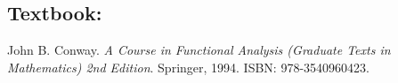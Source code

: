 \documentclass[margin]{res}
\theoremstyle{plain}
\theoremstyle{definition}
\theoremstyle{remark}
\begin{document}
\begin{resume}

\section{Textbook:} John B. Conway. \textit{A Course in Functional Analysis (Graduate Texts in Mathematics) 2nd Edition}. Springer, 1994. 
ISBN: 978-3540960423.



% 



\end{resume}
\end{document}
